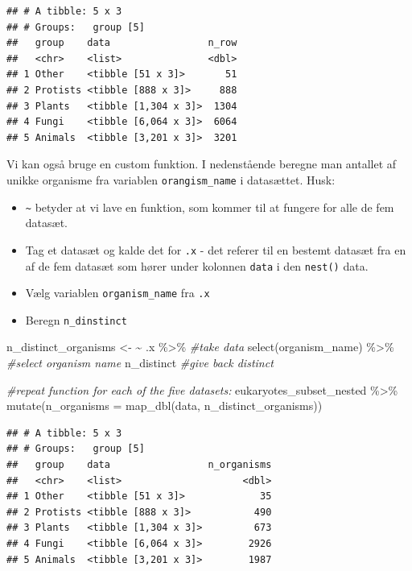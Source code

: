 \documentclass[
]{book}
\newenvironment{Shaded}{\begin{snugshade}}{\end{snugshade}}
\newcommand{\AttributeTok}[1]{\textcolor[rgb]{0.77,0.63,0.00}{#1}}
\newcommand{\CommentTok}[1]{\textcolor[rgb]{0.56,0.35,0.01}{\textit{#1}}}
\newcommand{\ErrorTok}[1]{\textcolor[rgb]{0.64,0.00,0.00}{\textbf{#1}}}
\newcommand{\FunctionTok}[1]{\textcolor[rgb]{0.00,0.00,0.00}{#1}}
\newcommand{\NormalTok}[1]{#1}
\newcommand{\OtherTok}[1]{\textcolor[rgb]{0.56,0.35,0.01}{#1}}
\newcommand{\SpecialCharTok}[1]{\textcolor[rgb]{0.00,0.00,0.00}{#1}}
\providecommand{\tightlist}{%
  \setlength{\itemsep}{0pt}\setlength{\parskip}{0pt}}
\begin{document}
\begin{verbatim}
## # A tibble: 5 x 3
## # Groups:   group [5]
##   group    data                 n_row
##   <chr>    <list>               <dbl>
## 1 Other    <tibble [51 x 3]>       51
## 2 Protists <tibble [888 x 3]>     888
## 3 Plants   <tibble [1,304 x 3]>  1304
## 4 Fungi    <tibble [6,064 x 3]>  6064
## 5 Animals  <tibble [3,201 x 3]>  3201
\end{verbatim}

Vi kan også bruge en custom funktion. I nedenstående beregne man antallet af unikke organisme fra variablen \texttt{orangism\_name} i datasættet. Husk:

\begin{itemize}
\tightlist
\item
  \texttt{\textasciitilde{}} betyder at vi lave en funktion, som kommer til at fungere for alle de fem datasæt.
\item
  Tag et datasæt og kalde det for \texttt{.x} - det referer til en bestemt datasæt fra en af de fem datasæt som hører under kolonnen \texttt{data} i den \texttt{nest()} data.
\item
  Vælg variablen \texttt{organism\_name} fra \texttt{.x}
\item
  Beregn \texttt{n\_dinstinct}
\end{itemize}

\begin{Shaded}
\begin{Highlighting}[]
\NormalTok{n\_distinct\_organisms }\OtherTok{\textless{}{-}} \ErrorTok{\textasciitilde{}}\NormalTok{ .x }\SpecialCharTok{\%\textgreater{}\%} \CommentTok{\#take data}
  \FunctionTok{select}\NormalTok{(organism\_name) }\SpecialCharTok{\%\textgreater{}\%}  \CommentTok{\#select organism name}
\NormalTok{  n\_distinct }\CommentTok{\#give back distinct}
\end{Highlighting}
\end{Shaded}

\begin{Shaded}
\begin{Highlighting}[]
\CommentTok{\#repeat function for each of the five datasets:}
\NormalTok{eukaryotes\_subset\_nested }\SpecialCharTok{\%\textgreater{}\%} 
  \FunctionTok{mutate}\NormalTok{(}\AttributeTok{n\_organisms =} \FunctionTok{map\_dbl}\NormalTok{(data, n\_distinct\_organisms))}
\end{Highlighting}
\end{Shaded}

\begin{verbatim}
## # A tibble: 5 x 3
## # Groups:   group [5]
##   group    data                 n_organisms
##   <chr>    <list>                     <dbl>
## 1 Other    <tibble [51 x 3]>             35
## 2 Protists <tibble [888 x 3]>           490
## 3 Plants   <tibble [1,304 x 3]>         673
## 4 Fungi    <tibble [6,064 x 3]>        2926
## 5 Animals  <tibble [3,201 x 3]>        1987
\end{verbatim}
\end{document}
